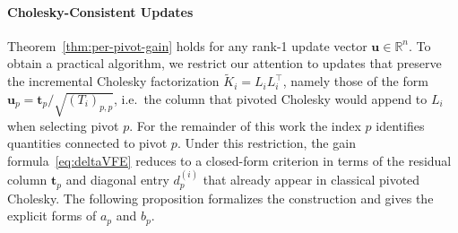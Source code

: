 \documentclass[onefignum,onetabnum]{siamart250211}
\begin{document}
\paragraph{Cholesky-Consistent Updates}
Theorem~\ref{thm:per-pivot-gain} holds for any rank-1 update vector $\bm{u} \in \mathbb{R}^n$. To obtain a practical algorithm, we restrict our attention to updates that preserve the incremental Cholesky factorization $\widetilde{K}_i = L_i L_i^\top$, namely those of the form $\bm{u}_p = \bm{t}_p/\sqrt{(T_i)_{p,p}}$, i.e.~the column that pivoted Cholesky would append to $L_i$ when selecting pivot $p$. For the remainder of this work the index $p$ identifies quantities connected to pivot $p$.
Under this restriction, the gain formula~\eqref{eq:deltaVFE} reduces to a closed-form criterion in terms of the residual column $\bm{t}_p$ and diagonal entry $d_p^{(i)}$ that already appear in classical pivoted Cholesky.
The following proposition formalizes the construction and gives the explicit forms of $a_p$ and $b_p$.
\end{document}
